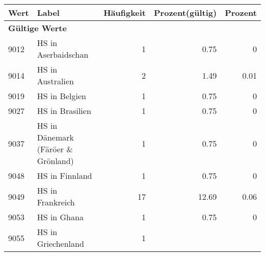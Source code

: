      \begin{longtable}{lXrrr}
     \toprule
     \textbf{Wert} & \textbf{Label} & \textbf{Häufigkeit} & \textbf{Prozent(gültig)} & \textbf{Prozent} \\
     \endhead
     \midrule
     \multicolumn{5}{l}{\textbf{Gültige Werte}}\\
        9012 & \multicolumn{1}{X}{HS in Aserbaidschan} & %
          \num{1} &
          \num[round-mode=places,round-precision=2]{0.75} &
          \num[round-mode=places,round-precision=2]{0} \\
        9014 & \multicolumn{1}{X}{HS in Australien} & %
          \num{2} &
          \num[round-mode=places,round-precision=2]{1.49} &
          \num[round-mode=places,round-precision=2]{0.01} \\
        9019 & \multicolumn{1}{X}{HS in Belgien} & %
          \num{1} &
          \num[round-mode=places,round-precision=2]{0.75} &
          \num[round-mode=places,round-precision=2]{0} \\
        9027 & \multicolumn{1}{X}{HS in Brasilien} & %
          \num{1} &
          \num[round-mode=places,round-precision=2]{0.75} &
          \num[round-mode=places,round-precision=2]{0} \\
        9037 & \multicolumn{1}{X}{HS in Dänemark (Färöer \& Grönland)} & %
          \num{1} &
          \num[round-mode=places,round-precision=2]{0.75} &
          \num[round-mode=places,round-precision=2]{0} \\
        9048 & \multicolumn{1}{X}{HS in Finnland} & %
          \num{1} &
          \num[round-mode=places,round-precision=2]{0.75} &
          \num[round-mode=places,round-precision=2]{0} \\
        9049 & \multicolumn{1}{X}{HS in Frankreich} & %
          \num{17} &
          \num[round-mode=places,round-precision=2]{12.69} &
          \num[round-mode=places,round-precision=2]{0.06} \\
        9053 & \multicolumn{1}{X}{HS in Ghana} & %
          \num{1} &
          \num[round-mode=places,round-precision=2]{0.75} &
          \num[round-mode=places,round-precision=2]{0} \\
        9055 & \multicolumn{1}{X}{HS in Griechenland} & %
          \num{1} &

\end{longtable}
